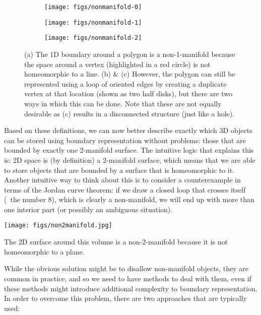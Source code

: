 \begin{figure}
\centering
\begin{subfigure}[b]{0.3\linewidth}
\texttt{[image: figs/nonmanifold-0]}
\caption{}%
\label{subfig:nonmanifold-0}
\end{subfigure}
\quad
\begin{subfigure}[b]{0.3\linewidth}
\texttt{[image: figs/nonmanifold-1]}
\caption{}%
\label{subfig:nonmanifold-1}
\end{subfigure}
\quad
\begin{subfigure}[b]{0.3\linewidth}
\texttt{[image: figs/nonmanifold-2]}
\caption{}%
\label{subfig:nonmanifold-2}
\end{subfigure}
\caption{(a) The 1D boundary around a polygon is a non-1-manifold because the space around a vertex (highlighted in a red circle) is not homeomorphic to a line. (b) \& (c) However, the polygon can still be represented using a loop of oriented edges by creating a duplicate vertex at that location (shown as two half disks), but there are two ways in which this can be done.
Note that these are not equally desirable as (c) results in a disconnected structure (just like a hole).}%
\label{fig:nonmanifold}
\end{figure}

Based on these definitions, we can now better describe exactly which 3D objects can be stored using boundary representation without problems: those that are bounded by exactly one 2-manifold surface.
The intuitive logic that explains this is: 2D space is (by definition) a 2-manifold surface, which means that we are able to store objects that are bounded by a surface that is homeomorphic to it.
Another intuitive way to think about this is to consider a counterexample in terms of the Jordan curve theorem: if we draw a closed loop that crosses itself (\eg\ the number 8), which is clearly a non-manifold, we will end up with more than one interior part (or possibly an ambiguous situation).

\begin{marginfigure}
\centering
\texttt{[image: figs/non2manifold.jpg]}
\caption{The 2D surface around this volume is a non-2-manifold because it is not homeomorphic to a plane.}%
\label{fig:non2manifold}
\end{marginfigure}

While the obvious solution might be to disallow non-manifold objects, they are common in practice, and so we need to have methods to deal with them, even if these methods might introduce additional complexity to boundary representation.
In order to overcome this problem, there are two approaches that are typically used:

